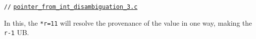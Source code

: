\documentclass[acmsmall,review,screen]{acmart}\settopmatter{printfolios=true,printccs=false,printacmref=false}
\newcommand{\myparagraph}[1]{\vspace{0.5\baselineskip}\par\noindent{\normalsize\bfseries{#1}}\quad}
\newcommand{\mytesturl}[1]{https://cerberus.cl.cam.ac.uk/cerberus?defacto/#1}
\newcommand{\mytestlink}[2]{\href{\mytesturl{#1}}{#2}}
\newcommand{\mylsttestlink}[1]{\mytestlink{#1}{\lstinline{#1}}}
\newcommand{\mylistingmargin}{5mm}
\newcommand{\myfooexample}[3]{{\vspace*{-0.5\baselineskip}\par{\noindent\small\hspace*{\mylistingmargin}\lstinline{//} \mylsttestlink{#2}\vspace*{0.25\baselineskip}\par}}}
\begin{document}
\vfill

\begin{center}
  \begin{minipage}[t]{0.49\textwidth}
{\renewcommand{\mylistingmargin}{0mm}\myfooexample{charon_tests}{pointer_from_int_disambiguation_3.c}{}%
}
\vspace*{-0\baselineskip}
\end{minipage}
  \end{center}
In this, the \lstinline{*r=11} will resolve the provenance of the
value in one way, making the \lstinline{r-1} UB. 





\end{document}
